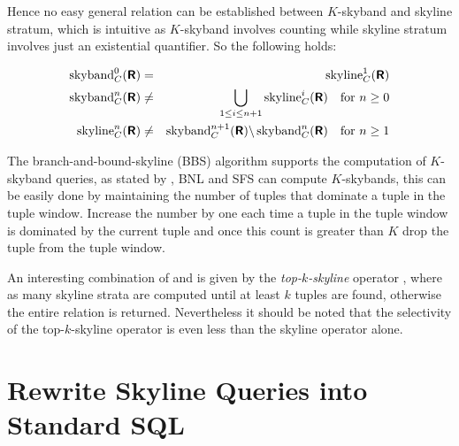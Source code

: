 \noindent
Hence no easy general relation can be established between $K$-skyband
and skyline stratum, which is intuitive as $K$-skyband involves counting
while skyline stratum involves just an existential quantifier.
So the following holds:


\begin{eqnarray}
\skyband_C^0(\relation{R}) &=& \skyline_C^1(\relation{R}) \label{equ:skyband} \\
\skyband_C^n(\relation{R}) &\not=& \bigunion_{1 \le i \le n+1} \skyline_C^i(\relation{R}) \quad \textnormal{for}\ n \ge 0\label{equ:skybandgeneral} \\
\skyline_C^n(\relation{R}) &\not=& \skyband_C^{n+1}(\relation{R}) \difference \skyband_C^n(\relation{R}) \quad \textnormal{for}\ n \ge 1
\end{eqnarray}

The branch-and-bound-skyline (BBS) algorithm \citep{Papadias2005} supports the
computation of $K$-skyband queries, as stated by \citet{Papadias2005},
BNL and SFS can compute $K$-skybands, this can be easily done by
maintaining the number of tuples that dominate a tuple in the tuple
window. Increase the number by one each time a tuple in the tuple
window is dominated by the current tuple and once this count is
greater than $K$ drop the tuple from the tuple window.


An interesting combination of  and
 is given by the
\emph{top-$k$-skyline} operator
\citep{Brando2007, Goncalves2005a, Goncalves2005}, where as many 
skyline strata are computed until at least $k$ tuples are found, otherwise
the entire relation is returned.  Nevertheless it should be noted that
the selectivity of the top-$k$-skyline operator is even less
than the skyline operator alone.


\section{Rewrite Skyline Queries into Standard SQL}
\label{sec:rewrite-to-sql}

